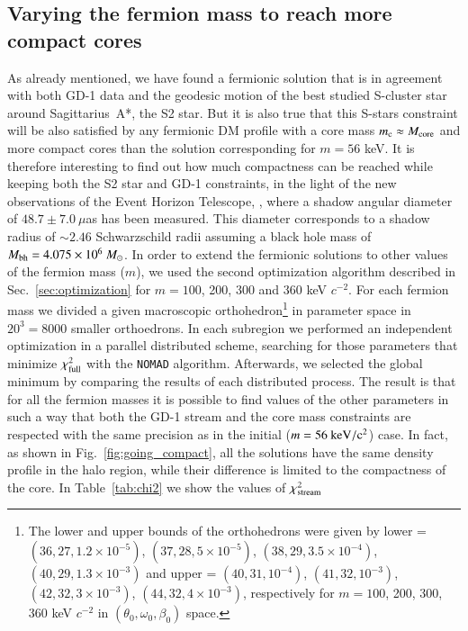 \documentclass[twocolumn]{aa}
\begin{document}
\subsection{Varying the fermion mass to reach more compact cores}
As already mentioned, we have found a fermionic solution that is in agreement with both GD-1 data and
the geodesic motion of the best studied S-cluster star around Sagittarius~A*, the S2 star. But it is also true that this S-stars constraint will be also satisfied by any fermionic DM profile
with a core mass $m_\mathrm{c}\approx M_{\rm{core}}$ and more compact cores than the solution corresponding for $m=56$ keV. It is therefore interesting to find out how much compactness can be reached
while keeping both the S2 star and \hbox{GD-1} constraints, in the light of the new observations
of the Event Horizon Telescope, \cite{EHT_image}, where a shadow angular diameter of $48.7\pm7.0~\mu$as
has been measured. This diameter corresponds to a shadow radius of $\sim 2.46$ Schwarzschild radii assuming
a black hole mass of $M_{\rm{bh}}=4.075\times10^6~M_\odot$.
In order to extend the fermionic solutions to other values of the fermion mass ($m$), we used the second optimization algorithm described in Sec.~\ref{sec:optimization} for $m=100$, 200, 300 and 360 keV $c^{-2}$. For each fermion mass we divided a given macroscopic orthohedron\footnote{The lower and upper bounds of the orthohedrons were given by
lower = $(36, 27, 1.2\times10^{-5})$, $(37, 28, 5\times10^{-5})$, $(38, 29, 3.5\times10^{-4})$, $(40, 29, 1.3\times10^{-3})$ and
upper = $(40, 31, 10^{-4})$, $(41, 32, 10^{-3})$, $(42, 32, 3\times10^{-3})$, $(44, 32, 4\times10^{-3})$, respectively for $m=100$, 200, 300, 360 keV $c^{-2}$ in $(\theta_0, \omega_0, \beta_0)$ space.}
in parameter space in $20^3=8000$ smaller orthoedrons. In each subregion we performed an independent optimization in a parallel distributed scheme, searching for those parameters that minimize $\chi^2_{\rm{full}}$ with the \texttt{NOMAD} algorithm. Afterwards, we selected the global minimum by comparing the results of each distributed process.
The result is that for all the fermion masses it is possible to find values of the other parameters in such a way that both the GD-1 stream and the core mass constraints  are respected with the same precision as in the initial ($m=56~\rm{keV}/c^2$) case. In fact, as shown in Fig.~\ref{fig:going_compact}, all the solutions have the same density profile in the halo region, while their difference is limited to the compactness of the core.
In Table~\ref{tab:chi2} we show the values of $\chi^2_{\rm{stream}}$
\end{document}
